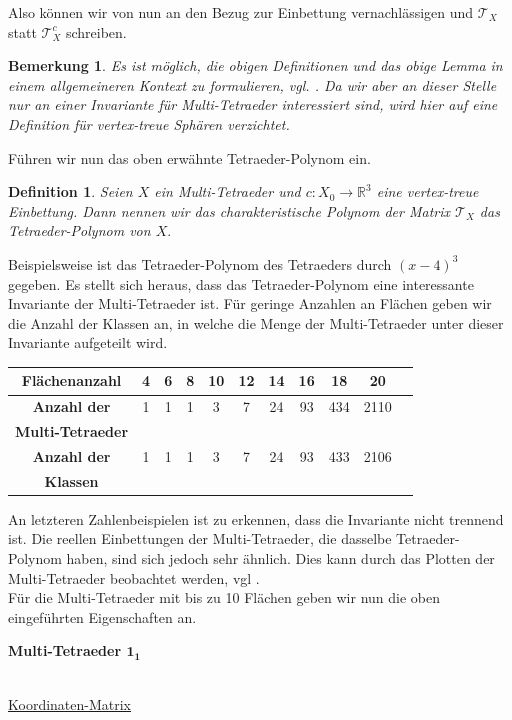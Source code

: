 \documentclass[12pt,titlepage,twoside,cleardoublepage]{article}
\theoremstyle{nummermitklammern}
\newtheorem{definition}[temp]{Definition}
\newtheorem{bemerkung}[temp]{Bemerkung}
\newtheorem{definition}[zahl]{Definition}
\newtheorem{bemerkung}[zahl]{Bemerkung}
\numberwithin{equation}{section}
\begin{document}
Also können wir von nun an den Bezug zur Einbettung vernachlässigen und $\mathcal{T}_X$ statt $\mathcal{T}_X^c$ schreiben. 
\begin{bemerkung}
Es ist möglich, die obigen Definitionen und das obige Lemma in einem allgemeineren Kontext zu formulieren, vgl. \cite{ans}. Da wir aber an dieser Stelle nur an einer Invariante für Multi-Tetraeder interessiert sind, wird hier auf eine Definition für vertex-treue Sphären verzichtet. 
\end{bemerkung}
Führen wir nun das oben erwähnte Tetraeder-Polynom ein.
\begin{definition}
Seien $X$ ein Multi-Tetraeder und $c:X_0\to \mathbb{R}^3$ eine vertex-treue Einbettung. Dann nennen wir das charakteristische Polynom der Matrix $\mathcal{T}_X$ das \emph{Tetraeder-Polynom} von $X.$
\end{definition}
Beispielsweise ist das Tetraeder-Polynom des Tetraeders durch $(x-4)^3$ gegeben.
Es stellt sich heraus, dass das Tetraeder-Polynom eine interessante Invariante der Multi-Tetraeder ist. Für geringe Anzahlen an Flächen geben wir die Anzahl der Klassen an, in welche die Menge der Multi-Tetraeder unter dieser Invariante aufgeteilt wird.
\begin{center}
\begin{tabular}{|c|c|c|c|c|c|c|c|c|c|c|}
\hline
\textbf{Flächenanzahl} &4&6&8&10&12&14&16&18&20\\
\hline
\textbf{Anzahl der}&1&1&1&3&7&24&93&434&2110\\
\textbf{Multi-Tetraeder}&&&&&&&&& \\
\hline
\textbf{Anzahl der}&1&1&1&3&7&24&93&433&2106\\
 \textbf{Klassen}&&&&&&&&&\\
\hline
\end{tabular}
 \end{center}
 An letzteren Zahlenbeispielen ist zu erkennen, dass die Invariante nicht trennend ist. Die reellen Einbettungen der Multi-Tetraeder, die dasselbe Tetraeder-Polynom haben, sind  sich jedoch sehr ähnlich. Dies kann durch das Plotten der Multi-Tetraeder beobachtet werden, vgl \cite{gapsimp}.\\
 Für die Multi-Tetraeder mit bis zu 10 Flächen geben wir nun die oben eingeführten Eigenschaften an.\\
 \begin{large}
 \textbf{Multi-Tetraeder $\textbf{1}_\textbf{1}$}
 \end{large}\\
\underline{Koordinaten-Matrix} 
\end{document}
